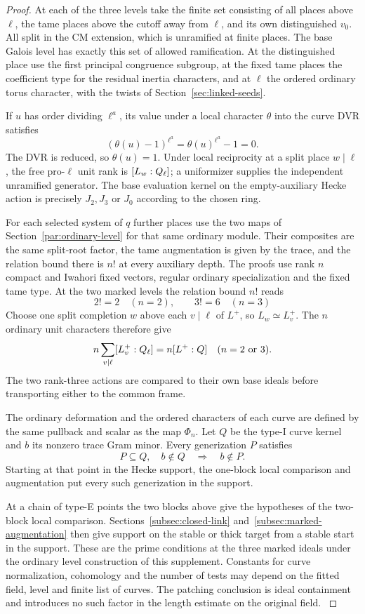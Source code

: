 \begin{proof}
At each of the three levels take the finite set consisting of all
places above \(\ell\), the tame places above the cutoff away from
\(\ell\), and its own distinguished \(v_0\). All split in the CM
extension, which is unramified at finite places. The base Galois
level has exactly this set of allowed ramification. At the
distinguished place use the first principal congruence subgroup,
at the fixed tame places the coefficient type for the residual
inertia characters, and at \(\ell\) the ordered ordinary torus
character, with the twists of Section~\ref{sec:linked-seeds}.

If \(u\) has order dividing \(\ell^a\), its value under a local character \(\theta\) into the curve DVR satisfies
\[
 (\theta(u)-1)^{\ell^a}=\theta(u)^{\ell^a}-1=0.
\]
The DVR is reduced, so \(\theta(u)=1\). Under local reciprocity at a split place \(w\mid\ell\), the free pro-\(\ell\) unit rank is \([L_w:Q_\ell]\); a uniformizer supplies the independent unramified generator.
The base evaluation kernel on the empty-auxiliary Hecke action is
precisely \(J_2,J_3\) or \(J_0\) according to the chosen ring.

For each selected system of \(q\) further places use the two maps
of Section~\ref{par:ordinary-level} for that same ordinary module.
Their composites are the same split-root factor, the tame
augmentation is given by the trace, and the relation bound there is
\(n!\) at every auxiliary depth. The proofs use rank \(n\) compact
and Iwahori fixed vectors, regular ordinary specialization and the
fixed tame type. At the two marked levels the relation bound \(n!\) reads
\[
 2!=2\quad(n=2),\qquad 3!=6\quad(n=3)
\] Choose one split completion \(w\) above each \(v\mid\ell\) of \(L^+\), so \(L_w\simeq L^+_v\). The \(n\) ordinary unit characters therefore give
\[
 n\sum_{v\mid\ell}[L^+_v:Q_\ell]=n[L^+:Q]
 \quad(n=2\text{ or }3).
\]
The two rank-three actions are compared to their own base ideals before transporting either to the common frame.

The ordinary deformation and the ordered characters of each curve
are defined by the same pullback and scalar as the map \(\Phi_n\).
Let \(Q\) be the type-I curve kernel and \(b\) its nonzero trace Gram minor. Every generization \(P\) satisfies 
\[
 P\subseteq Q,\quad b\notin Q\quad\Longrightarrow\quad b\notin P.
\]
 Starting at that point in the Hecke support,
the one-block local comparison and augmentation put every such
generization in the support.

At a chain of type-E points the two
blocks above give the hypotheses of the two-block local comparison.
Sections~\ref{subsec:closed-link} and~\ref{subsec:marked-augmentation}
then give support on the stable or thick target from a stable
start in the support. These are the prime conditions at the three
marked ideals under the ordinary level construction of this
supplement. Constants for curve normalization, cohomology and the
number of tests may depend on the fitted field, level and finite
list of curves. The patching conclusion is ideal containment and
introduces no such factor in the length estimate on the original field. \label{cor:ordinary-marked-points-1}
\end{proof}
